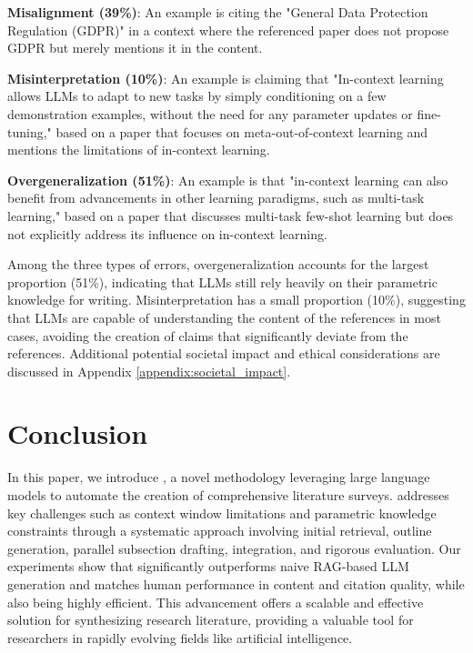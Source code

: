 \textbf{Misalignment (39\%)}: An example is citing the "General Data Protection Regulation (GDPR)" in a context where the referenced paper does not propose GDPR but merely mentions it in the content.

\textbf{Misinterpretation (10\%)}: An example is claiming that "In-context learning allows LLMs to adapt to new tasks by simply conditioning on a few demonstration examples, without the need for any parameter updates or fine-tuning," based on a paper that focuses on meta-out-of-context learning and mentions the limitations of in-context learning.

\textbf{Overgeneralization (51\%)}: An example is that "in-context learning can also benefit from advancements in other learning paradigms, such as multi-task learning," based on a paper that discusses multi-task few-shot learning but does not explicitly address its influence on in-context learning.

Among the three types of errors, overgeneralization accounts for the largest proportion (51\%), indicating that LLMs still rely heavily on their parametric knowledge for writing. Misinterpretation has a small proportion (10\%), suggesting that LLMs are capable of understanding the content of the references in most cases, avoiding the creation of claims that significantly deviate from the references. Additional potential societal impact and ethical considerations are discussed in Appendix \ref{appendix:societal_impact}.

\section{Conclusion}

In this paper, we introduce \ourmethod, a novel methodology leveraging large language models to automate the creation of comprehensive literature surveys. \ourmethod addresses key challenges such as context window limitations and parametric knowledge constraints through a systematic approach involving initial retrieval, outline generation, parallel subsection drafting, integration, and rigorous evaluation. Our experiments show that \ourmethod significantly outperforms naive RAG-based LLM generation and matches human performance in content and citation quality, while also being highly efficient. This advancement offers a scalable and effective solution for synthesizing research literature, providing a valuable tool for researchers in rapidly evolving fields like artificial intelligence.




